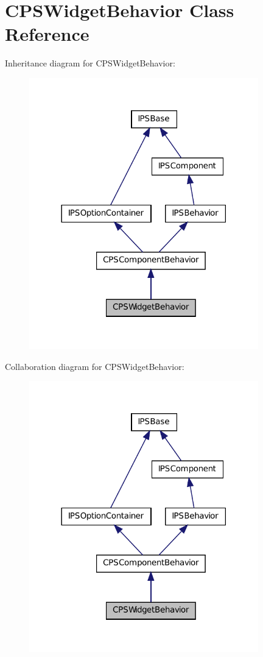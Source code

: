 \hypertarget{classCPSWidgetBehavior}{
\section{CPSWidgetBehavior Class Reference}
\label{classCPSWidgetBehavior}
}


Inheritance diagram for CPSWidgetBehavior:\nopagebreak
\begin{figure}[H]
\begin{center}
\leavevmode
\includegraphics[width=282pt]{classCPSWidgetBehavior__inherit__graph}
\end{center}
\end{figure}


Collaboration diagram for CPSWidgetBehavior:\nopagebreak
\begin{figure}[H]
\begin{center}
\leavevmode
\includegraphics[width=282pt]{classCPSWidgetBehavior__coll__graph}
\end{center}
\end{figure}
